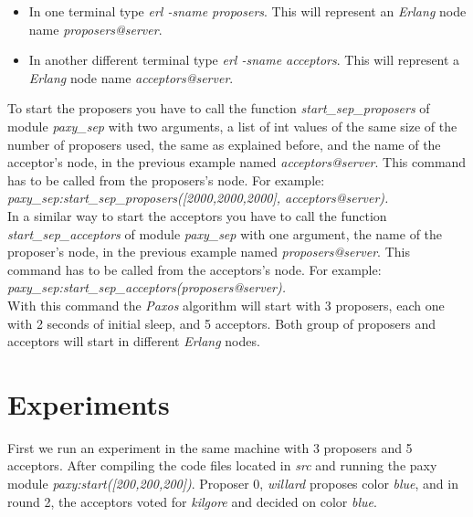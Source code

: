 \documentclass[a4paper, 11pt]{article}
\begin{document}
\begin{itemize}

\item In one terminal type \textit{erl -sname proposers}. This will represent an \textit{Erlang} node name \textit{proposers@server}.

\item In another different terminal type \textit{erl -sname acceptors}. This will represent a \textit{Erlang} node name \textit{acceptors@server}.

\end{itemize}

To start the proposers you have to call the function \textit{start\_sep\_proposers} of module \textit{paxy\_sep} with two arguments, a list of int values of the same size of the number of proposers used, the same as explained before, and the name of the acceptor's node, in the previous example named \textit{acceptors@server}. This command has to be called from the proposers's node. For example: \\

\textit{paxy\_sep:start\_sep\_proposers([2000,2000,2000], acceptors@server).}\\

In a similar way to start the acceptors you have to call the function \textit{start\_sep\_acceptors} of module \textit{paxy\_sep} with one argument, the name of the proposer's node, in the previous example named \textit{proposers@server}. This command has to be called from the acceptors's node. For example: \\

\textit{paxy\_sep:start\_sep\_acceptors(proposers@server).}\\

With this command the \textit{Paxos} algorithm will start with 3 proposers, each one with 2 seconds of initial sleep, and 5 acceptors. Both group of proposers and acceptors will start in different \textit{Erlang} nodes.

\section{Experiments}

First we run an experiment in the same machine with 3 proposers and 5 acceptors. After compiling the code files located in \textit{src} and running the paxy module \textit{paxy:start([200,200,200])}. Proposer 0, \textit{willard} proposes color \textit{blue}, and in round 2, the acceptors voted for \textit{kilgore} and decided on color \textit{blue}.\\
\end{document}
